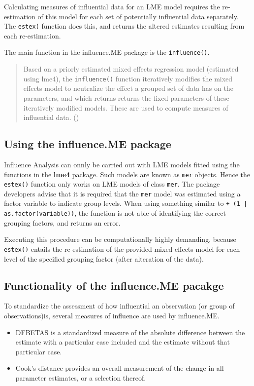 \documentclass[12pt, a4paper]{article}
\begin{document}
Calculating measures of influential data for an LME model requires the re-estimation
of this model for each set of potentially influential data separately. The \texttt{estex(} function does this,
and returns the altered estimates resulting from each re-estimation. 

The main function in the influence.ME package is the \texttt{influence()}.

\begin{quote} Based on a priorly estimated
	mixed effects regression model (estimated using lme4), the \texttt{influence()} function iteratively modifies
	the mixed effects model to neutralize the effect a grouped set of data has on the parameters, and
	which returns returns the fixed parameters of these iteratively modified models. These are used to
	compute measures of influential data. ()
\end{quote}

\subsection*{Using the influence.ME package}
Influence Analysis can onnly be carried out with LME models fitted using the functions in the \textbf{lme4} package. Such models are known as \texttt{mer} objects.
Hence the \texttt{estex()} function only works on LME
models of class \texttt{mer}.
The package developers advise that it is required that the \texttt{mer} model was estimated using a factor variable to indicate group levels.
When using something similar to \texttt{+ (1 | as.factor(variable))}, the function is not able of
identifying the correct grouping factors, and returns an error.

Executing this procedure can be computationally highly demanding, because \texttt{estex()} entails the re-estimation of the provided mixed effects model for each level of the specified grouping factor (after alteration of the data).
\subsection*{Functionality of the influence.ME pacakge}
To standardize the assessment of how influential an observation (or group of observations)is, several measures
of influence are used by influence.ME.


\begin{itemize}
	\item DFBETAS is a standardized measure of the absolute difference
	between the estimate with a particular case included and the estimate without that particular
	case. 
	\item Cook’s distance provides an overall measurement of the change in all parameter
	estimates, or a selection thereof.
\end{itemize}
\end{document}
